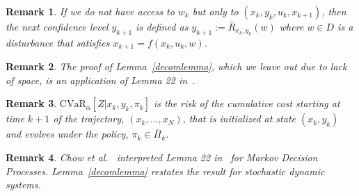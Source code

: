 \documentclass[letterpaper, 10 pt, conference]{ieeeconf}  %
\newtheorem{remark}{Remark}
\begin{document}
%
\begin{remark}
If we do not have access to $w_k$ but only to $(x_k, y_k, u_k, x_{k+1})$, then the next confidence level $y_{k+1}$ is defined as $y_{k+1} := \bar{R}_{x_k, y_k}(w)$ where $w \in D$ is a disturbance that satisfies $x_{k+1} = f(x_k, u_k, w)$.
\end{remark}
%
\begin{remark}
The proof of Lemma~\ref{decomlemma}, which we leave out due to lack of space, is an application of Lemma 22 in~\cite{pflug2016time}. 
\end{remark}
%
\begin{remark}
$\text{CVaR}_\alpha [ Z | x_k, y_k, \pi_k ]$ is the risk of 
the cumulative cost starting at time $k+1$ of the trajectory, $(x_k, \dots, x_N)$, that is initialized at state $(x_k, y_k)$ 
and evolves under the policy, $\pi_k \in \bar{\Pi}_k$.
\end{remark}
%
%
%
%
\begin{remark}
Chow et al.~\cite{chow2015risk} interpreted Lemma 22 in~\cite{pflug2016time} for Markov Decision Processes.
Lemma~\ref{decomlemma} restates the result for stochastic dynamic systems.
\end{remark}
%
\end{document}
